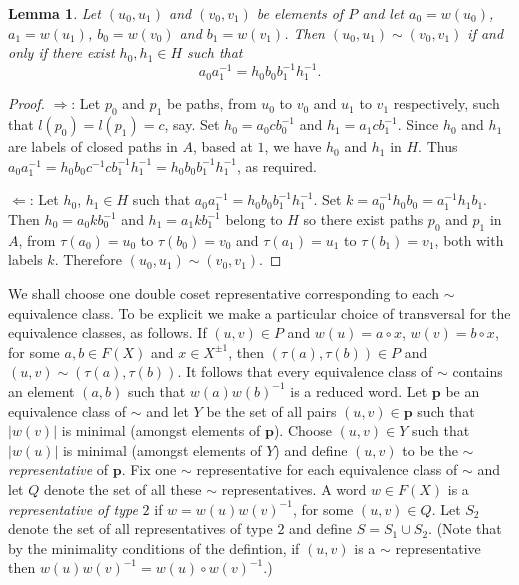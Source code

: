 \documentclass[a4paper,12pt]{article}
\renewcommand{\t}{\tau }
\newcommand{\pp}{\mathbf{p}}
\newtheorem{lemma}[theorem]{Lemma}
\numberwithin{equation}{section}
\numberwithin{figure}{section}
\begin{document}
\begin{lemma}\label{lem:equiv_verts}
Let $(u_0,u_1)$ and $(v_0,v_1)$ be elements of $P$ and let 
$a_0=w(u_0)$, $a_1=w(u_1)$, $b_0=w(v_0)$ and $b_1=w(v_1)$. Then 
$(u_0,u_1)\sim (v_0,v_1)$ if and only if there exist $h_0,h_1\in H$ such that
\[a_0a_1^{-1}=h_0b_0b_1^{-1}h_1^{-1}.\]
\end{lemma}  
\begin{proof}
$\Rightarrow$: Let $p_0$ and $p_1$ be paths, from $u_0$ to $v_0$ and $u_1$ to $v_1$ 
respectively, such that $l(p_0)=l(p_1)=c$, say. Set $h_0=a_0cb_0^{-1}$ and 
$h_1=a_1cb_1^{-1}$. Since $h_0$ and $h_1$ are labels of closed paths in $A$, based at $1$, we
have $h_0$ and $h_1$ in $H$. Thus 
$a_0a_1^{-1}=h_0b_0c^{-1}cb_1^{-1}h_1^{-1}=h_0b_0b_1^{-1}h_1^{-1}$, as required.

$\Leftarrow$: Let $h_0$, $h_1 \in H$ such that $a_0a_1^{-1}=h_0b_0b_1^{-1}h_1^{-1}$. 
Set $k=a_0^{-1}h_0b_0=a_1^{-1}h_1b_1$. Then $h_0=a_0kb_0^{-1}$ and $h_1=a_1kb_1^{-1}$
belong to $H$ so there exist paths $p_0$ and $p_1$ in $A$, 
from $\t(a_0)=u_0$ to $\t(b_0)=v_0$ and 
$\t(a_1)=u_1$ to $\t(b_1)=v_1$, both with labels $k$. 
Therefore $(u_0,u_1)\sim (v_0,v_1)$. 
\end{proof}  

We shall choose one double coset representative corresponding to each $\sim$ 
equivalence class. To be explicit we make a particular choice of transversal
for the equivalence classes, as follows. 
If $(u,v)\in P$ and $w(u)=a\circ x$, $w(v)=b\circ x$, for some $a,b\in F(X)$ and 
$x\in X^{\pm 1}$, then $(\t(a),\t(b))\in P$ and $(u,v)\sim (\t(a),\t(b))$. It follows
that every equivalence class of $\sim$ contains an element $(a,b)$ such that
$w(a)w(b)^{-1}$ is a reduced word. Let $\pp$ be an equivalence class of $\sim$ and
let $Y$ be the set of all pairs $(u,v)\in \pp$ such that $|w(v)|$ is minimal (amongst
elements of $\pp$). Choose $(u,v)\in Y$ such that $|w(u)|$ is minimal (amongst elements
of $Y$) and define $(u,v)$ to be the $\sim${\em representative} of $\pp$. Fix
one $\sim$ representative for each equivalence class of $\sim$ and  
let $Q$ denote the set of  all these $\sim$ representatives. A word $w\in F(X)$ is
 a {\em representative of type} $2$ if $w=w(u)w(v)^{-1}$, for some $(u,v)\in Q$. 
Let $S_2$ denote the set of all representatives of type $2$ and define $S=S_1\cup S_2$.
(Note that by the minimality conditions of the defintion, if $(u,v)$ is a 
$\sim$ representative then $w(u)w(v)^{-1}=w(u)\circ w(v)^{-1}$.)
\end{document}
